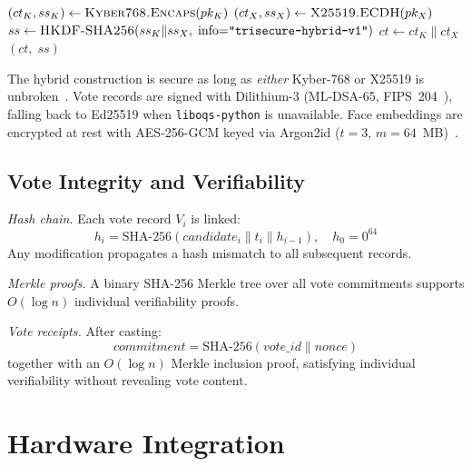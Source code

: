 \documentclass[pdflatex,sn-vancouver-num]{sn-jnl}%
\theoremstyle{thmstyleone}%
\theoremstyle{thmstyletwo}%
\theoremstyle{thmstylethree}%
\begin{document}
\begin{algorithm}[t]
\caption{TRIsecure HybridKEM.Encapsulate(\(pk\))}
\begin{algorithmic}[1]
  \State \((ct_K, ss_K) \gets \textsc{Kyber768.Encaps}(pk_K)\)
  \State \((ct_X, ss_X) \gets \textsc{X25519.ECDH}(pk_X)\)
  \State \(ss \gets \textsc{HKDF-SHA256}(ss_K \| ss_X,\;
    \text{info}{=}\texttt{"trisecure-hybrid-v1"})\)
  \State \(ct \gets ct_K \| ct_X\)
  \State \Return \((ct,\; ss)\)
\end{algorithmic}
\end{algorithm}

The hybrid construction is secure as long as \emph{either} Kyber-768 or X25519
is unbroken~\cite{bernstein2017post}. Vote records are signed with Dilithium-3
(ML-DSA-65, FIPS~204~\cite{nist_fips204}), falling back to Ed25519 when
\texttt{liboqs-python} is unavailable. Face embeddings are encrypted at rest
with AES-256-GCM keyed via Argon2id (\(t{=}3\),
\(m{=}64\)~MB)~\cite{biryukov2016argon2}.

\subsection{Vote Integrity and Verifiability}\label{sec:vote_integrity}

\textit{Hash chain.} Each vote record \(V_i\) is linked:
\begin{equation}
  h_i = \mathrm{SHA\text{-}256}(\mathit{candidate}_i \| t_i \| h_{i-1}),
  \quad h_0 = 0^{64}
\end{equation}
Any modification propagates a hash mismatch to all subsequent records.

\textit{Merkle proofs.} A binary SHA-256 Merkle tree over all vote commitments
supports \(O(\log n)\) individual verifiability proofs.

\textit{Vote receipts.} After casting:
\begin{equation}
  \mathit{commitment} = \mathrm{SHA\text{-}256}(\mathit{vote\_id} \| \mathit{nonce})
\end{equation}
together with an \(O(\log n)\) Merkle inclusion proof, satisfying individual
verifiability without revealing vote content.

\section{Hardware Integration}\label{sec:hardware}
\end{document}
